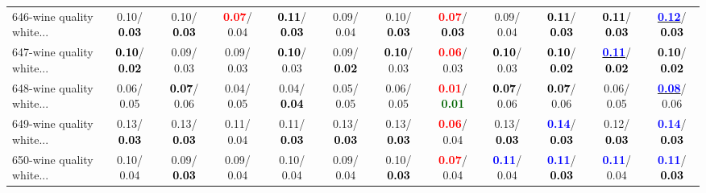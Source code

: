 \begin{table}[h]
\begin{center}
{\begin{tabular}{lc|c|c|c|c|c|c|c|c|c|c}
646-wine quality white... &   0.10/\textcolor{black}{\textbf{  0.03}} &   0.10/\textcolor{black}{\textbf{  0.03}} & \textcolor{red}{\textbf{  0.07}}/  0.04 & \textcolor{black}{\textbf{  0.11}}/\textcolor{black}{\textbf{  0.03}} &   0.09/  0.04 &   0.10/\textcolor{black}{\textbf{  0.03}} & \textcolor{red}{\textbf{  0.07}}/\textcolor{black}{\textbf{  0.03}} &   0.09/  0.04 & \textcolor{black}{\textbf{  0.11}}/\textcolor{black}{\textbf{  0.03}} & \textcolor{black}{\textbf{  0.11}}/\textcolor{black}{\textbf{  0.03}} & \underline{\textcolor{blue}{\textbf{  0.12}}}/\textcolor{black}{\textbf{  0.03}} \\
647-wine quality white... & \textcolor{black}{\textbf{  0.10}}/\textcolor{black}{\textbf{  0.02}} &   0.09/  0.03 &   0.09/  0.03 & \textcolor{black}{\textbf{  0.10}}/  0.03 &   0.09/\textcolor{black}{\textbf{  0.02}} & \textcolor{black}{\textbf{  0.10}}/  0.03 & \textcolor{red}{\textbf{  0.06}}/  0.03 & \textcolor{black}{\textbf{  0.10}}/  0.03 & \textcolor{black}{\textbf{  0.10}}/\textcolor{black}{\textbf{  0.02}} & \underline{\textcolor{blue}{\textbf{  0.11}}}/\textcolor{black}{\textbf{  0.02}} & \textcolor{black}{\textbf{  0.10}}/\textcolor{black}{\textbf{  0.02}} \\ \hline
648-wine quality white... &   0.06/  0.05 & \textcolor{black}{\textbf{  0.07}}/  0.06 &   0.04/  0.05 &   0.04/\textcolor{black}{\textbf{  0.04}} &   0.05/  0.05 &   0.06/  0.05 & \textcolor{red}{\textbf{  0.01}}/\textcolor{darkgreen}{\textbf{  0.01}} & \textcolor{black}{\textbf{  0.07}}/  0.06 & \textcolor{black}{\textbf{  0.07}}/  0.06 &   0.06/  0.05 & \underline{\textcolor{blue}{\textbf{  0.08}}}/  0.06 \\
649-wine quality white... &   0.13/\textcolor{black}{\textbf{  0.03}} &   0.13/\textcolor{black}{\textbf{  0.03}} &   0.11/  0.04 &   0.11/\textcolor{black}{\textbf{  0.03}} &   0.13/\textcolor{black}{\textbf{  0.03}} &   0.13/\textcolor{black}{\textbf{  0.03}} & \textcolor{red}{\textbf{  0.06}}/  0.04 &   0.13/\textcolor{black}{\textbf{  0.03}} & \textcolor{blue}{\textbf{  0.14}}/\textcolor{black}{\textbf{  0.03}} &   0.12/\textcolor{black}{\textbf{  0.03}} & \textcolor{blue}{\textbf{  0.14}}/\textcolor{black}{\textbf{  0.03}} \\
650-wine quality white... &   0.10/  0.04 &   0.09/\textcolor{black}{\textbf{  0.03}} &   0.09/  0.04 &   0.10/  0.04 &   0.09/  0.04 &   0.10/\textcolor{black}{\textbf{  0.03}} & \textcolor{red}{\textbf{  0.07}}/  0.04 & \textcolor{blue}{\textbf{  0.11}}/  0.04 & \textcolor{blue}{\textbf{  0.11}}/\textcolor{black}{\textbf{  0.03}} & \textcolor{blue}{\textbf{  0.11}}/  0.04 & \textcolor{blue}{\textbf{  0.11}}/\textcolor{black}{\textbf{  0.03}} \\

\end{tabular}}
\end{center}
\end{table}
